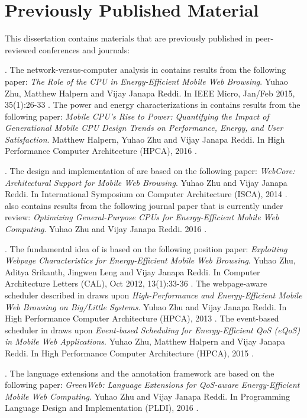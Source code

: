 \section{Previously Published Material}
\label{sec:intro:prev}

This dissertation contains materials that are previously published in peer-reviewed conferences and journals:

\textbf{}. The network-versus-computer analysis in  contains results from the following paper: \textit{The Role of the CPU in Energy-Efficient Mobile Web Browsing}. Yuhao Zhu, Matthew Halpern and Vijay Janapa Reddi. In IEEE Micro, Jan/Feb 2015, 35(1):26-33 \cite{zhu2015role}. The power and energy characterizations in  contains results from the following paper: \textit{Mobile CPU's Rise to Power: Quantifying the Impact of Generational Mobile CPU Design Trends on Performance, Energy, and User Satisfaction}. Matthew Halpern, Yuhao Zhu and Vijay Janapa Reddi. In High Performance Computer Architecture (HPCA), 2016 \cite{mobilecpu}.

\textbf{}. The design and implementation of \webcore are based on the following paper: \textit{WebCore: Architectural Support for Mobile Web Browsing}. Yuhao Zhu and Vijay Janapa Reddi. In International Symposium on Computer Architecture (ISCA), 2014 \cite{webcore}.  also contains results from the following journal paper that is currently under review: \textit{Optimizing General-Purpose CPUs for Energy-Efficient Mobile Web Computing}. Yuhao Zhu and Vijay Janapa Reddi. 2016 \cite{webcore-tocs}.

\textbf{}. The fundamental idea of \webrt is based on the following position paper:  \textit{Exploiting Webpage Characteristics for Energy-Efficient Mobile Web Browsing}. Yuhao Zhu, Aditya Srikanth, Jingwen Leng and Vijay Janapa Reddi. In Computer Architecture Letters (CAL), Oct 2012, 13(1):33-36 \cite{zhu2014exploiting}. The webpage-aware scheduler described in  draws upon \textit{High-Performance and Energy-Efficient Mobile Web Browsing on Big/Little Systems}. Yuhao Zhu and Vijay Janapa Reddi.  In High Performance Computer Architecture (HPCA), 2013 \cite{big-little}. The event-based scheduler in  draws upon \textit{Event-based Scheduling for Energy-Efficient QoS (eQoS) in Mobile Web Applications}. Yuhao Zhu, Matthew Halpern and Vijay Janapa Reddi. In High Performance Computer Architecture (HPCA), 2015 \cite{ebs}.

\textbf{}. The \greenweb language extensions and the \autogreen annotation framework are based on the following paper: \textit{GreenWeb: Language Extensions for QoS-aware Energy-Efficient Mobile Web Computing}. Yuhao Zhu and Vijay Janapa Reddi. In Programming Language Design and Implementation (PLDI), 2016 \cite{greenweb}.



